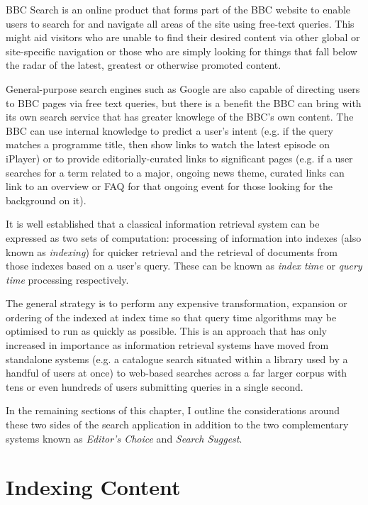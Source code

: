 \documentclass[10pt,a4paper]{report}
\begin{document}
BBC Search is an online product that forms part of the BBC website
to enable users to search for and navigate all areas of the site using
free-text queries. This might aid visitors who are unable to find their desired
content via other global or site-specific navigation or those who are simply
looking for things that fall below the radar of the latest, greatest or
otherwise promoted content.

General-purpose search engines such as Google are also capable of directing
users to BBC pages via free text queries, but there is a benefit the BBC
can bring with its own search service that has greater knowlege of the
BBC's own content. The BBC can use internal knowledge to predict a user's
intent (e.g. if the query matches a programme title, then show links to watch
the latest episode on iPlayer) or to provide editorially-curated
links to significant pages (e.g. if a user searches for a term
related to a major, ongoing news theme, curated links can
link to an overview or FAQ for that ongoing event for those
looking for the background on it).

It is well established that a classical information retrieval system
can be expressed as two sets of computation: processing of information
into indexes (also known as \emph{indexing}) for quicker retrieval
and the retrieval of documents from those indexes based on a user's
query. These can be known as \emph{index time} or \emph{query time}
processing respectively.

The general strategy is to perform
any expensive transformation, expansion or ordering of the indexed
at index time so that query time algorithms may be optimised to
run as quickly as possible. This is an approach that has only
increased in importance as information retrieval systems have moved
from standalone systems (e.g. a catalogue search situated within
a library used by a handful of users at once) to web-based
searches across a far larger corpus with tens or even hundreds of
users submitting queries in a single second.

In the remaining sections of this chapter, I outline the considerations
around these two sides of the search application in addition to the
two complementary systems known as \emph{Editor's Choice} and
\emph{Search Suggest}.

\section{Indexing Content}
\end{document}
